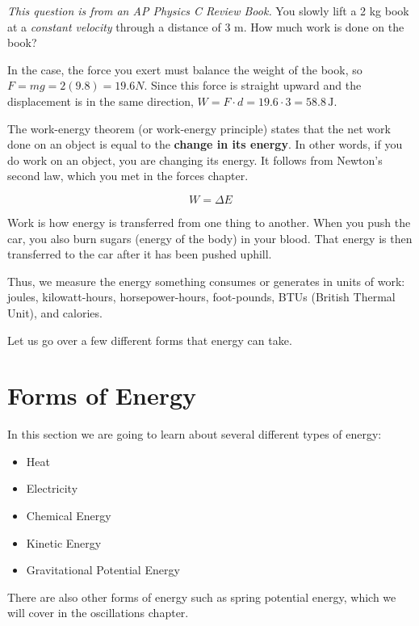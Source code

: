 \begin{Exercise}[label=work1, title={Book done by a constant force}]
	\emph{This question is from an AP Physics C Review Book.}
	You slowly lift a 2 kg book at a \emph{constant velocity} through a distance of 3 m. How much work is done on the book?
\end{Exercise}
\begin{Answer}[ref=work1]
	In the case, the force you exert must balance the weight of the book, so $F=mg=2(9.8)= 19.6 N$. 
	Since this force is straight upward and the displacement is in the same direction, $W = F\cdot d = 19.6 \cdot 3 = 58.8 \, \text{J}$.
\end{Answer}

The work-energy theorem (or work-energy principle) states that the net work done 
on an object is equal to the \textbf{change in its energy}. In other 
words, if you do work on an object, you are changing its energy. It follows from Newton's second law, which you met in the forces chapter. 

\[
W = \Delta E 
\]

Work is how energy is transferred from one thing to another. When you push the 
car, you also burn sugars (energy of the body) in your blood. That energy is then
transferred to the car after it has been pushed uphill.

Thus, we measure the energy something consumes or generates in units of work: 
joules, kilowatt-hours, horsepower-hours, foot-pounds, BTUs (British Thermal 
Unit), and calories.

Let us go over a few different forms that energy can take.

\section{Forms of Energy}

In this section we are going to learn about several different types of energy:
\begin{itemize}
\item Heat
\item Electricity
\item Chemical Energy
\item Kinetic Energy
\item Gravitational Potential Energy
\end{itemize}

There are also other forms of energy such as spring potential energy, which we will cover in the oscillations chapter.
